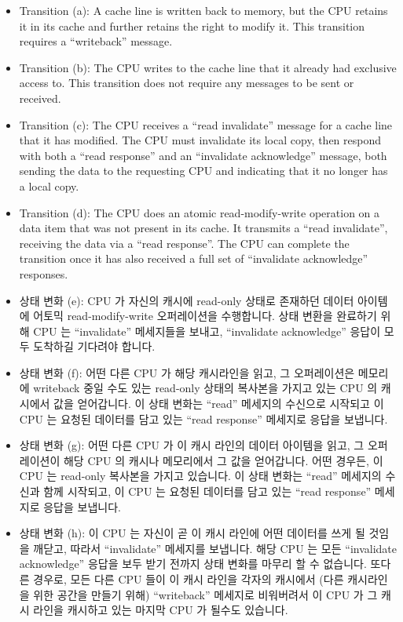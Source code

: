 \begin{itemize}
\item	Transition (a):
	A cache line is written back to memory, but the CPU retains
	it in its cache and further retains the right to modify it.
	This transition requires a ``writeback'' message.
\item	Transition (b):
	The CPU writes to the cache line that it already had exclusive
	access to.
	This transition does not require any messages to be sent or
	received.
\item	Transition (c):
	The CPU receives a ``read invalidate'' message for a cache line
	that it has modified.
	The CPU must invalidate its local copy, then respond with both a
	``read response'' and an ``invalidate acknowledge'' message,
	both sending the data to the requesting CPU and indicating
	that it no longer has a local copy.
\item	Transition (d):
	The CPU does an atomic read-modify-write operation on a data item
	that was not present in its cache.
	It transmits a ``read invalidate'', receiving the data via
	a ``read response''.
	The CPU can complete the transition once it has also received a
	full set of ``invalidate acknowledge'' responses.
\fi
\item	상태 변화 (e):
	CPU 가 자신의 캐시에 read-only 상태로 존재하던 데이터 아이템에 어토믹
	read-modify-write 오퍼레이션을 수행합니다.
	상태 변환을 완료하기 위해 CPU 는 ``invalidate'' 메세지들을 보내고,
	``invalidate acknowledge'' 응답이 모두 도착하길 기다려야 합니다.
\item	상태 변화 (f):
	어떤 다른 CPU 가 해당 캐시라인을 읽고, 그 오퍼레이션은 메모리에
	writeback 중일 수도 있는 read-only 상태의 복사본을 가지고 있는 CPU 의
	캐시에서 값을 얻어갑니다.
	이 상태 변화는 ``read'' 메세지의 수신으로 시작되고 이 CPU 는 요청된
	데이터를 담고 있는 ``read response'' 메세지로 응답을 보냅니다.
\item	상태 변화 (g):
	어떤 다른 CPU 가 이 캐시 라인의 데이터 아이템을 읽고, 그 오퍼레이션이
	해당 CPU 의 캐시나 메모리에서 그 값을 얻어갑니다.
	어떤 경우든, 이 CPU 는 read-only 복사본을 가지고 있습니다.
	이 상태 변화는 ``read'' 메세지의 수신과 함께 시작되고, 이 CPU 는 요청된
	데이터를 담고 있는 ``read response'' 메세지로 응답을 보냅니다.
\item	상태 변화 (h):
	이 CPU 는 자신이 곧 이 캐시 라인에 어떤 데이터를 쓰게 될 것임을 깨닫고,
	따라서 ``invalidate'' 메세지를 보냅니다.
	해당 CPU 는 모든 ``invalidate acknowledge'' 응답을 보두 받기 전까지
	상태 변화를 마무리 할 수 없습니다.
	또다른 경우로, 모든 다른 CPU 들이 이 캐시 라인을 각자의 캐시에서 (다른
	캐시라인을 위한 공간을 만들기 위해) ``writeback'' 메세지로 비워버려서
	이 CPU 가 그 캐시 라인을 캐시하고 있는 마지막 CPU 가 될수도 있습니다.
\iffalse


\end{itemize}
